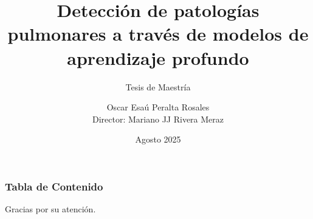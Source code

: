 \documentclass{beamer}
\title[Detección de patologías pulmonares]{Detección de patologías pulmonares a través de modelos de aprendizaje profundo}
\subtitle{Tesis de Maestría}
\author[Oscar Esaú Peralta]{Oscar Esaú Peralta Rosales\\Director: Mariano JJ Rivera Meraz}
\institute[CIMAT]{Centro de Investigación en Matemáticas A.C.}
\date{Agosto 2025}
\begin{document}
\frame{\titlepage}

\begin{frame}
\frametitle{Tabla de Contenido}
\tableofcontents
\end{frame}




















% 

\begin{frame}
\begin{center}
    Gracias por su atención.
\end{center}
\end{frame}
\end{document}
